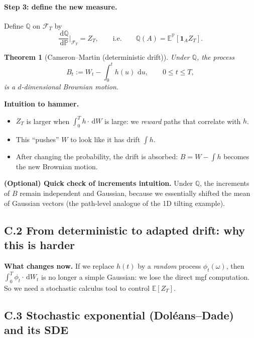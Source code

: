 \documentclass[11pt]{article}
\newcommand{\Pbb}{\mathbb{P}}
\newcommand{\Qbb}{\mathbb{Q}}
\newcommand{\E}{\mathbb{E}}
\newcommand{\dd}{\,\mathrm{d}}
\newcommand{\1}{\mathbf{1}}
\newtheorem{theorem}{Theorem}
\begin{document}
\paragraph{Step 3: define the new measure.}
Define $\Qbb$ on $\mathcal F_T$ by
\[
\frac{\dd\Qbb}{\dd\Pbb}\Big|_{\mathcal F_T}=Z_T,
\qquad\text{i.e.}\qquad
\Qbb(A)=\E^{\Pbb}[\mathbf{1}_A Z_T].
\]

\begin{theorem}[Cameron--Martin (deterministic drift)]
Under $\Qbb$, the process
\[
B_t
:=
W_t-\int_0^t h(u)\,\dd u,
\qquad 0\le t\le T,
\]
is a $d$-dimensional Brownian motion.
\end{theorem}


\textbf{Intuition to hammer.}
\begin{itemize}[leftmargin=1.4em]
\item $Z_T$ is larger when $\int_0^T h\cdot \dd W$ is large:
we \emph{reward} paths that correlate with $h$.
\item This ``pushes'' $W$ to look like it has drift $\int h$.
\item After changing the probability, the drift is absorbed:
$B=W-\int h$ becomes the new Brownian motion.
\end{itemize}



\textbf{(Optional) Quick check of increments intuition.}
Under $\Qbb$, the increments of $B$ remain independent and Gaussian,
because we essentially shifted the mean of Gaussian vectors
(the path-level analogue of the 1D tilting example).


\subsection*{C.2 From deterministic to adapted drift: why this is harder}


\textbf{What changes now.}
If we replace $h(t)$ by a \emph{random} process $\phi_t(\omega)$,
then $\int_0^T \phi_t\cdot \dd W_t$ is no longer a simple Gaussian:
we lose the direct mgf computation.
So we need a stochastic calculus tool to control $\E[Z_T]$.


\subsection*{C.3 Stochastic exponential (Doléans--Dade) and its SDE}
\end{document}
